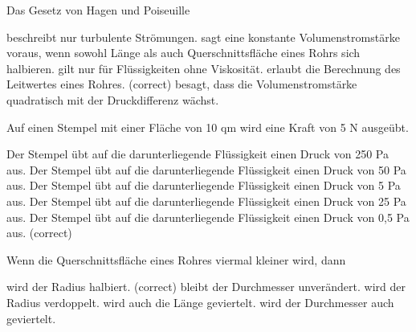 \documentclass[11pt]{exam}
\begin{document}
\setlength{\voffset}{-0.5in}
\setlength{\headsep}{5pt}

\hspace{2mm}
 \hspace{5mm}
\vspace{4mm}

\begin{questions}

\question Das Gesetz von Hagen und Poiseuille

\begin{choices}
	\choice beschreibt nur turbulente Strömungen.
	\choice sagt eine konstante Volumenstromstärke voraus, wenn sowohl Länge als auch Querschnittsfläche eines Rohrs sich halbieren.
	\choice gilt nur für Flüssigkeiten ohne Viskosität.
	\choice erlaubt die Berechnung des Leitwertes eines Rohres. (correct)
	\choice besagt, dass die Volumenstromstärke quadratisch mit der Druckdifferenz wächst.
\end{choices}

\vspace{3mm}\question Auf einen Stempel mit einer Fläche von 10 qm wird eine Kraft von 5 N ausgeübt.

\begin{choices}
	\choice Der Stempel übt auf die darunterliegende Flüssigkeit einen Druck von 250 Pa aus.
	\choice Der Stempel übt auf die darunterliegende Flüssigkeit einen Druck von 50 Pa aus.
	\choice Der Stempel übt auf die darunterliegende Flüssigkeit einen Druck von 5 Pa aus.
	\choice Der Stempel übt auf die darunterliegende Flüssigkeit einen Druck von 25 Pa aus.
	\choice Der Stempel übt auf die darunterliegende Flüssigkeit einen Druck von 0,5 Pa aus. (correct)
\end{choices}

\vspace{3mm}\question Wenn die Querschnittsfläche eines Rohres viermal kleiner wird, dann

\begin{choices}
	\choice wird der Radius halbiert. (correct)
	\choice bleibt der Durchmesser unverändert.
	\choice wird der Radius verdoppelt.
	\choice wird auch die Länge geviertelt.
	\choice wird der Durchmesser auch geviertelt.
\end{choices}


\end{questions}
\end{document}
